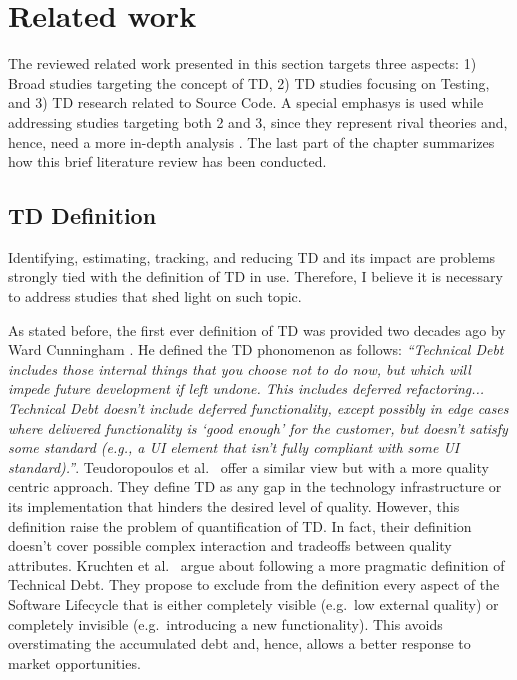 \chapter{Related work}

The reviewed related work presented in this section targets three aspects: 1) Broad studies targeting the concept of TD, 2) TD studies focusing on Testing, and 3) TD research related to Source Code. A special emphasys is used while addressing studies targeting both 2 and 3, since they represent rival theories and, hence, need a more in-depth analysis \cite{case_study_guide}. The last part of the chapter summarizes how this brief literature review has been conducted.

\section{TD Definition}
Identifying, estimating, tracking, and reducing TD and its impact are problems strongly tied with the definition of TD in use. Therefore, I believe it is necessary to address studies that shed light on such topic.

As stated before, the first ever definition of TD was provided two decades ago by Ward Cunningham \cite{first_mention_of_TD}. He defined the TD phonomenon as follows:
\textit{“Technical Debt includes those internal things that you choose
not to do now, but which will impede future development if left
undone. This includes deferred refactoring... Technical Debt doesn't include deferred functionality, except possibly in edge cases where delivered functionality is ‘good enough’ for the customer, but doesn't satisfy some standard (e.g., a UI element that isn't fully compliant with some UI standard).”}. Teudoropoulos et al.\ \cite{td_from_stakeholder_perspective} offer a similar view but with a more quality centric approach. They define TD as any gap in the technology infrastructure or its implementation that hinders the desired level of quality. However, this definition raise the problem of quantification of TD. In fact, their definition doesn't cover possible complex interaction and tradeoffs between quality attributes. %
Kruchten et al.\ \cite{td_from_debt_to_metaphor} argue about following a more pragmatic definition of Technical Debt. They propose to exclude from the definition every aspect of the Software Lifecycle that is either completely visible (e.g.\ low external quality) or completely invisible (e.g.\ introducing a new functionality). This avoids overstimating the accumulated debt and, hence, allows a better response to market opportunities.

